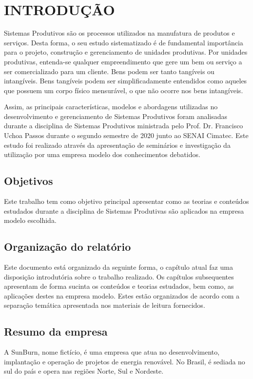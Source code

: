 \chapter{INTRODUÇÃO}
\label{chap:intro}
Sistemas Produtivos são os processos utilizados na manufatura de produtos e serviços. Desta forma, o seu estudo sistematizado é de fundamental importância para o projeto, construção e gerenciamento de unidades produtivas. Por unidades produtivas, entenda-se qualquer empreendimento que gere um bem ou serviço a ser comercializado para um cliente. Bens podem ser tanto tangíveis ou intangíveis. Bens tangíveis podem ser simplificadamente entendidos como aqueles que possuem um corpo físico mensurável, o que não ocorre nos bens intangíveis.

Assim, as principais características, modelos e abordagens utilizadas no desenvolvimento e gerenciamento de Sistemas Produtivos foram analisadas durante a disciplina de Sistemas Produtivos ministrada pelo Prof. Dr. Francisco Uchoa Passos durante o segundo semestre de 2020 junto ao SENAI Cimatec. Este estudo foi realizado através da apresentação de seminários e investigação da utilização por uma empresa modelo dos conhecimentos debatidos.


\section{Objetivos}
\label{sec:obj}
Este trabalho tem como objetivo principal apresentar como as teorias e conteúdos estudados durante a disciplina de Sistemas Produtivas são aplicados na empresa modelo escolhida.


\section{Organização do relatório}
\label{sec:org}
Este documento está organizado da seguinte forma, o capítulo atual faz uma disposição introdutória sobre o trabalho realizado. Os capítulos subsequentes apresentam de forma sucinta os conteúdos e teorias estudados, bem como, as aplicações destes na empresa modelo. Estes estão organizados de acordo com a separação temática apresentada nos materiais de leitura fornecidos.

\section{Resumo da empresa}
\label{sec:rese}
A SunBurn, nome fictício, é uma empresa que atua no desenvolvimento, implantação e operação de projetos de energia renovável. No Brasil, é sediada no sul do país e opera nas regiões Norte, Sul e Nordeste.

